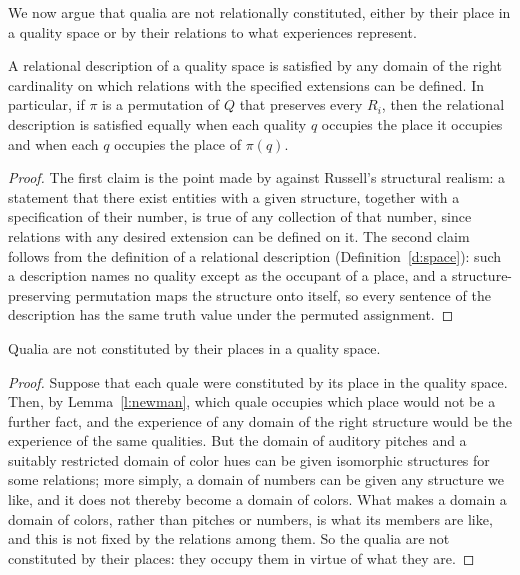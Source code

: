 \documentclass{situationist-preprint}
\begin{document}
We now argue that qualia are not relationally constituted, either by their place in a quality space or by their relations to what experiences represent.

\begin{lemma}\label{l:newman}
A relational description of a quality space is satisfied by any domain of the right cardinality on which relations with the specified extensions can be defined. In particular, if $\pi$ is a permutation of $Q$ that preserves every $R_i$, then the relational description is satisfied equally when each quality $q$ occupies the place it occupies and when each $q$ occupies the place of $\pi(q)$.
\end{lemma}

\begin{proof}
The first claim is the point made by \citet{Newman1928} against Russell's structural realism: a statement that there exist entities with a given structure, together with a specification of their number, is true of any collection of that number, since relations with any desired extension can be defined on it. The second claim follows from the definition of a relational description (Definition~\ref{d:space}): such a description names no quality except as the occupant of a place, and a structure-preserving permutation maps the structure onto itself, so every sentence of the description has the same truth value under the permuted assignment.
\end{proof}

\begin{lemma}\label{l:notrel}
Qualia are not constituted by their places in a quality space.
\end{lemma}

\begin{proof}
Suppose that each quale were constituted by its place in the quality space. Then, by Lemma~\ref{l:newman}, which quale occupies which place would not be a further fact, and the experience of any domain of the right structure would be the experience of the same qualities. But the domain of auditory pitches and a suitably restricted domain of color hues can be given isomorphic structures for some relations; more simply, a domain of numbers can be given any structure we like, and it does not thereby become a domain of colors. What makes a domain a domain of colors, rather than pitches or numbers, is what its members are like, and this is not fixed by the relations among them. So the qualia are not constituted by their places: they occupy them in virtue of what they are.
\end{proof}
\end{document}
